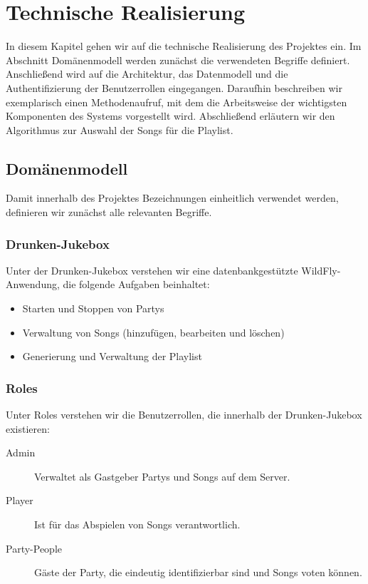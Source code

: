 \newpage
\section{Technische Realisierung}
In diesem Kapitel gehen wir auf die technische Realisierung des Projektes ein. Im Abschnitt Domänenmodell werden zunächst die verwendeten Begriffe definiert. Anschließend wird auf die Architektur, das Datenmodell und die Authentifizierung der Benutzerrollen eingegangen. Daraufhin beschreiben wir exemplarisch einen Methodenaufruf, mit dem die Arbeitsweise der wichtigsten Komponenten des Systems vorgestellt wird. Abschließend erläutern wir den Algorithmus zur Auswahl der Songs für die Playlist.

\subsection{Domänenmodell}
\label{sec:Domaenenmodell}
Damit innerhalb des Projektes Bezeichnungen einheitlich verwendet werden, definieren wir zunächst alle relevanten Begriffe.

\subsubsection{Drunken-Jukebox}
\label{sec:drunkenJukebox}
Unter der Drunken-Jukebox verstehen wir eine datenbankgestützte WildFly-Anwendung, die folgende Aufgaben beinhaltet:

\begin{itemize}
	\item Starten und Stoppen von Partys
	\item Verwaltung von Songs (hinzufügen, bearbeiten und löschen)
	\item Generierung und Verwaltung der Playlist
\end{itemize}

\subsubsection{Roles}
Unter Roles verstehen wir die Benutzerrollen, die innerhalb der Drunken-Jukebox existieren:

\begin{description}
	\item [Admin] Verwaltet als Gastgeber Partys und Songs auf dem Server.
	\item [Player] Ist für das Abspielen von Songs verantwortlich.
	\item [Party-People\footnotemark] Gäste der Party, die eindeutig identifizierbar sind und Songs voten können.
\end{description}


